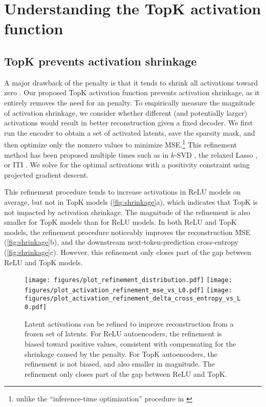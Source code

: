 


\section{Understanding the TopK activation function}


\subsection{TopK prevents activation shrinkage}
\label{sec:shrinkage}

A major drawback of the \Lone  penalty is that it tends to shrink all activations toward zero \citep{tibshirani1996regression}.
Our proposed TopK activation function prevents activation shrinkage, as it entirely removes the need for an \Lone penalty.
To empirically measure the magnitude of activation shrinkage, we consider whether different (and potentially larger) activations would result in better reconstruction given a fixed decoder. We first run the encoder to obtain a set of activated latents, save the sparsity mask, and then optimize only the nonzero values to minimize MSE.\footnote{unlike the ``inference-time optimization'' procedure in \cite{nanda2024progress}} This refinement method has been proposed multiple times such as in $k$-SVD \citep{aharon2006k}, the relaxed Lasso \citep{meinshausen2007relaxed}, or ITI \citep{maleki2009coherence}. We solve for the optimal activations with a positivity constraint using projected gradient descent.  %


This refinement procedure tends to increase activations in ReLU models on average, but not in TopK models (\autoref{fig:shrinkage}a), which indicates that TopK is not impacted by activation shrinkage.  The magnitude of the refinement is also smaller for TopK models than for ReLU models.  In both ReLU and TopK models, the refinement procedure noticeably improves the reconstruction MSE (\autoref{fig:shrinkage}b), and the downstream next-token-prediction cross-entropy (\autoref{fig:shrinkage}c). %
However, this refinement only closes part of the gap between ReLU and TopK models.



\begin{figure}[t]
    \centering
    \texttt{[image: figures/plot\_refinement\_distribution.pdf]}
    \texttt{[image: figures/plot\_activation\_refinement\_mse\_vs\_L0.pdf]}
    \texttt{[image: figures/plot\_activation\_refinement\_delta\_cross\_entropy\_vs\_L0.pdf]}
    \caption{Latent activations can be refined to improve reconstruction from a frozen set of latents.  For ReLU autoencoders, the refinement is biased toward positive values, consistent with compensating for the shrinkage caused by the \Lone penalty. For TopK autoencoders, the refinement is not biased, and also smaller in magnitude. The refinement only closes part of the gap between ReLU and TopK.}
    \label{fig:shrinkage}
\end{figure}


